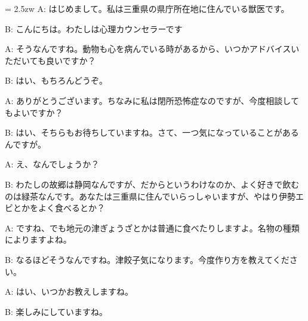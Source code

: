 \documentclass[11pt]{amsart}
\title{}
\author{}
\newenvironment{hangall}[1]{\hangindent = 2.5zw\everypar{\hangindent = 2.5zw}}{}
\begin{document}
\maketitle
\begin{hangall}{}%
A: はじめまして。私は三重県の県庁所在地に住んでいる獣医です。



B: こんにちは。わたしは心理カウンセラーです



A: そうなんですね。動物も心を病んでいる時があるから、いつかアドバイスいただいても良いですか？



B: はい、もちろんどうぞ。



A: ありがとうございます。ちなみに私は閉所恐怖症なのですが、今度相談してもよいですか？



B: はい、そちらもお待ちしていますね。さて、一つ気になっていることがあるんですが。



A: え、なんでしょうか？



B: わたしの故郷は静岡なんですが、だからというわけなのか、よく好きで飲むのは緑茶なんです。あなたは三重県に住んでいらっしゃいますが、やはり伊勢エビとかをよく食べるとか？



A: ですね、でも地元の津ぎょうざとかは普通に食べたりしますよ。名物の種類によりますよね。



B: なるほどそうなんですね。津餃子気になります。今度作り方を教えてください。



A: はい、いつかお教えしますね。



B: 楽しみにしていますね。\end{hangall}
\end{document}
